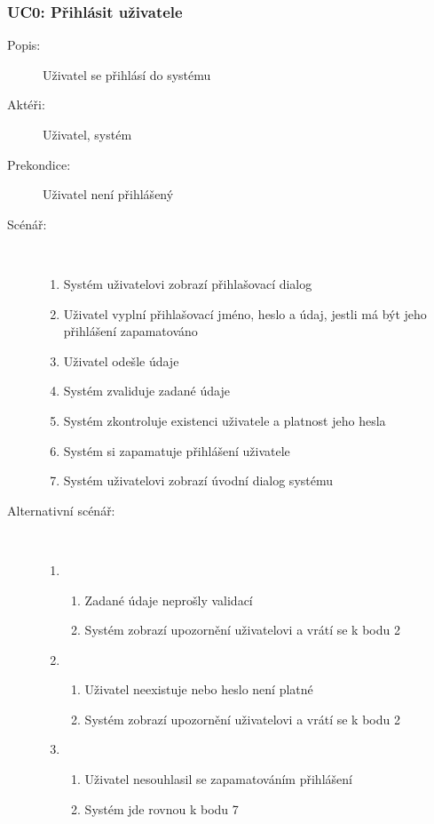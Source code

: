 \documentclass[a4paper,10pt]{article}
\begin{document}
	\subsubsection*{UC0: Přihlásit uživatele}
	\begin{description}
		\item[Popis:] Uživatel se přihlásí do systému
		\item[Aktéři:] Uživatel, systém
		\item[Prekondice:] Uživatel není přihlášený
		\item[Scénář:] \hfill \\
				\begin{enumerate}
					\item Systém uživatelovi zobrazí přihlašovací dialog
					\item Uživatel vyplní přihlašovací jméno, heslo a údaj, jestli má být jeho přihlášení zapamatováno
					\item Uživatel odešle údaje
					\item Systém zvaliduje zadané údaje
					\item Systém zkontroluje existenci uživatele a platnost jeho hesla
					\item Systém si zapamatuje přihlášení uživatele
					\item Systém uživatelovi zobrazí úvodní dialog systému
				\end{enumerate}
		\item[Alternativní scénář:] \hfill \\
				\begin{enumerate}
					\setcounter{enumi}{4}
					\setcounter{enumii}{0}
					\begin{enumerate}[label*=\arabic*.,leftmargin=8pt]
						\item
						\begin{enumerate}[label=\alph*.]
							\item Zadané údaje neprošly validací
							\item Systém zobrazí upozornění uživatelovi a vrátí se k bodu 2
						\end{enumerate}
						\setcounter{enumi}{5}
						\setcounter{enumii}{0}
						\item
						\begin{enumerate}[label=\alph*.]
							\item Uživatel neexistuje nebo heslo není platné
							\item Systém zobrazí upozornění uživatelovi a vrátí se k bodu 2
						\end{enumerate}
						\setcounter{enumi}{6}
						\setcounter{enumii}{0}
						\item
						\begin{enumerate}[label=\alph*.]
							\item Uživatel nesouhlasil se zapamatováním přihlášení
							\item Systém jde rovnou k bodu 7
						\end{enumerate}
					\end{enumerate}		
				\end{enumerate}
	\end{description}
\end{document}
